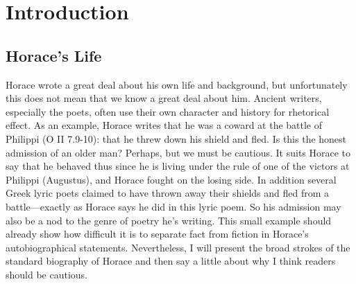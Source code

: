 \chapter*{Introduction}

\section*{Horace's Life}

Horace wrote a great deal about his own life and background, but unfortunately this does not mean that we know a great deal about him.  Ancient writers, especially the poets, often use their own character and history for rhetorical effect.  As an example, Horace writes that he was a coward at the battle of Philippi (O II 7.9-10): that he threw down his shield and fled. Is this the honest admission of an older man? Perhaps, but we must be cautious.  It suits Horace to say that he behaved thus since he is living under the rule of one of the victors at Philippi (Augustus), and Horace fought on the losing side.  In addition several Greek lyric poets claimed to have thrown away their shields and fled from a battle---exactly as Horace says he did in this lyric poem.  So his admission may also be a nod to the genre of poetry he's writing.  This small example should already show how difficult it is to separate fact from fiction in Horace's autobiographical statements.  Nevertheless, I will present the broad strokes of the standard biography of Horace and then say a little about why I think readers should be cautious.

